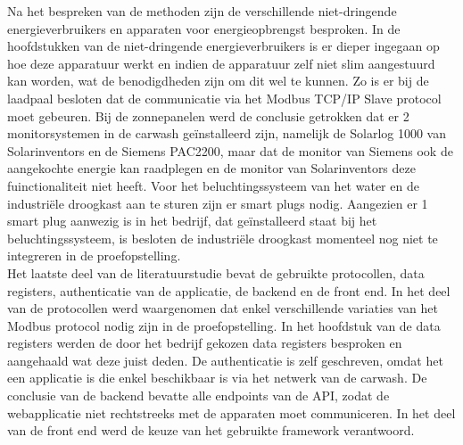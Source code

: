 Na het bespreken van de methoden zijn de verschillende niet-dringende energieverbruikers en apparaten voor energieopbrengst besproken. In de hoofdstukken van de niet-dringende energieverbruikers is er dieper ingegaan op hoe deze apparatuur werkt en indien de apparatuur zelf niet slim aangestuurd kan worden, wat de benodigdheden zijn om dit wel te kunnen. Zo is er bij de laadpaal besloten dat de communicatie via het Modbus TCP/IP Slave protocol moet gebeuren. Bij de zonnepanelen werd de conclusie getrokken dat er 2 monitorsystemen in de carwash geïnstalleerd zijn, namelijk de Solarlog 1000 van Solarinventors en de Siemens PAC2200, maar dat de monitor van Siemens ook de aangekochte energie kan raadplegen en de monitor van Solarinventors deze fuinctionaliteit niet heeft. Voor het beluchtingssysteem van het water en de industriële droogkast aan te sturen zijn er smart plugs nodig. Aangezien er 1 smart plug aanwezig is in het bedrijf, dat geïnstalleerd staat bij het beluchtingssysteem, is besloten de industriële droogkast momenteel nog niet te integreren in de proefopstelling.\\

Het laatste deel van de literatuurstudie bevat de gebruikte protocollen, data registers, authenticatie van de applicatie, de backend en de front end. In het deel van de protocollen werd waargenomen dat enkel verschillende variaties van het Modbus protocol nodig zijn in de proefopstelling. In het hoofdstuk van de data registers werden de door het bedrijf gekozen data registers besproken en aangehaald wat deze juist deden. De authenticatie is zelf geschreven, omdat het een applicatie is die enkel beschikbaar is via het netwerk van de carwash. De conclusie van de backend bevatte alle endpoints van de API, zodat de webapplicatie niet rechtstreeks met de apparaten moet communiceren. In het deel van de front end werd de keuze van het gebruikte framework verantwoord.